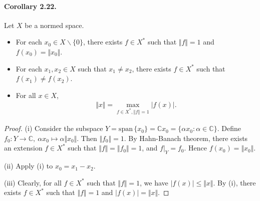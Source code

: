 \documentclass{article}
\begin{document}
\paragraph{Corollary 2.22.\label{cor:2.22}} Let $X$ be a normed space. \begin{itemize}
	\item[(i)] For each $x_0\in X\backslash\{0\}$, there exists $f\in X^*$ such that $\Vert f\Vert = 1$ and $f(x_0)=\Vert x_0\Vert$.
	\item[(ii)] For each $x_1,x_2\in X$ such that $x_1\neq x_2$, there exists $f\in X^*$ such that $f(x_1)\neq f(x_2)$.
	\item[(iii)] For all $x\in X$,
	\begin{align*}
		\Vert x\Vert = \max_{f\in X^*,\left\Vert f\right\Vert=1}\vert f(x)\vert.
	\end{align*}
\end{itemize}
\begin{proof}
(i) Consider the subspace $Y=\mathrm{span}\,\{x_0\}=\mathbb{C}x_0 =\{\alpha x_0:\alpha\in\mathbb{C}\}$. Define $f_0:Y\to\mathbb{C},\ \alpha x_0\mapsto \alpha\Vert x_0\Vert$. Then $\Vert f_0\Vert=1$. By Hahn-Banach theorem, there exists an extension $f\in X^*$ such that $\Vert f\Vert=\Vert f_0\Vert=1$, and $f|_{Y}=f_0$. Hence $f(x_0)=\Vert x_0\Vert$. 
\vspace{0.1cm}

(ii) Apply (i) to $x_0=x_1-x_2$.
\vspace{0.1cm}

(iii) Clearly, for all $f\in X^*$ such that $\Vert f\Vert=1$, we have $\vert f(x)\vert \leq \Vert x\Vert$.  By (i), there exists $f\in X^*$ such that $\Vert f\Vert=1$ and $\vert f(x)\vert =\Vert x\Vert$.
\end{proof}
\end{document}
